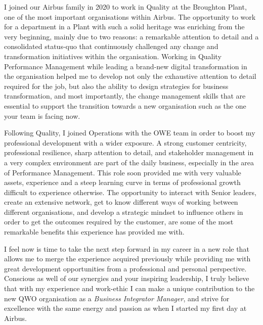\documentclass[11pt,a4paper]{letter}
\begin{document}
{\setlength{\parindent}{5mm}
  

I joined our Airbus family in 2020 to work in Quality at the Broughton Plant, one of the most important organisations within Airbus. The opportunity to work for a department in a Plant with such a solid heritage was enriching from the very beginning, mainly due to two reasons: a remarkable attention to detail and a consolidated status-quo that continuously challenged any change and transformation initiatives within the organisation. Working in Quality Performance Management while leading a brand-new digital transformation in the organisation helped me to develop not only the exhaustive attention to detail required for the job, but also the ability to design strategies for business transformation, and most importantly, the change management skills that are essential to support the transition towards a new organisation such as the one your team is facing now.

 
Following Quality, I joined Operations with the OWE team in order to boost my professional development with a wider exposure. A strong customer centricity, professional resilience, sharp attention to detail, and stakeholder management in a very complex environment are part of the daily business, especially in the area of Performance Management. This role soon provided me with very valuable assets, experience and a steep learning curve in terms of professional growth difficult to experience otherwise. The opportunity to interact with Senior leaders, create an extensive network, get to know different ways of working between different organisations, and develop a strategic mindset to influence others in order to get the outcomes required by the customer, are some of the most remarkable benefits this experience has provided me with.

I feel now is time to take the next step forward in my career in a new role that allows me to merge the experience acquired previously while providing me with great development opportunities from a professional and personal perspective. Conscious as well of our synergies and your inspiring leadership, I truly believe that with my experience and work-ethic I can make a unique contribution to the new QWO organisation as a \textit{Business Integrator Manager}, and strive for excellence with the same energy and passion as when I started my first day at Airbus.


}
\end{document}
